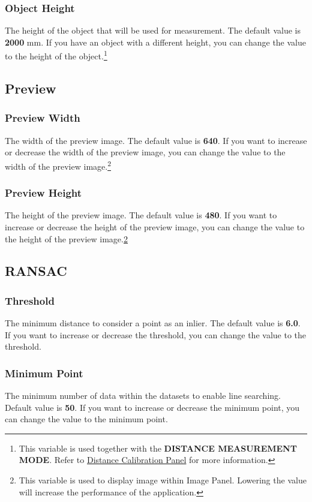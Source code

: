 \subsubsection{Object Height}
The height of the object that will be used for measurement. The default value is \textbf{2000} mm. If you have an object with a different height, you can change the value to the height of the object.\footnote{This variable is used together with the \textbf{DISTANCE MEASUREMENT MODE}. Refer to \hyperref[sec:distance-calibration-panel]{Distance Calibration Panel} for more information.}

\subsection{Preview}

\subsubsection{Preview Width}
The width of the preview image. The default value is \textbf{640}. If you want to increase or decrease the width of the preview image, you can change the value to the width of the preview image.\footnote{\label{label3}This variable is used to display image within Image Panel. Lowering the value will increase the performance of the application.}

\subsubsection{Preview Height}
The height of the preview image. The default value is \textbf{480}. If you want to increase or decrease the height of the preview image, you can change the value to the height of the preview image.\cref{label3}

\subsection{RANSAC}

\subsubsection{Threshold}
The minimum distance to consider a point as an inlier. The default value is \textbf{6.0}. If you want to increase or decrease the threshold, you can change the value to the threshold.

\subsubsection{Minimum Point}
The minimum number of data within the datasets to enable line searching. Default value is \textbf{50}. If you want to increase or decrease the minimum point, you can change the value to the minimum point.

